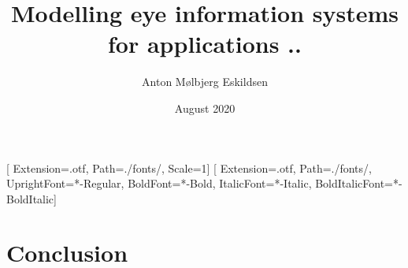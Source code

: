 \documentclass[11pt, a4paper, twoside]{report}
\title{Modelling eye information systems for applications ..}
\author{Anton Mølbjerg Eskildsen}
\date{August 2020}
\begin{document}
[
Extension={.otf},
Path=./fonts/,
Scale=1]
\setmainfont{STIX2Text}[
Extension={.otf},
Path=./fonts/,
UprightFont={*-Regular},
BoldFont={*-Bold},
ItalicFont={*-Italic},
BoldItalicFont={*-BoldItalic}]

\maketitle

\tableofcontents

\printnoidxglossaries
\printnomenclature[1in]















\chapter{Conclusion}

\printbibliography
\end{document}
